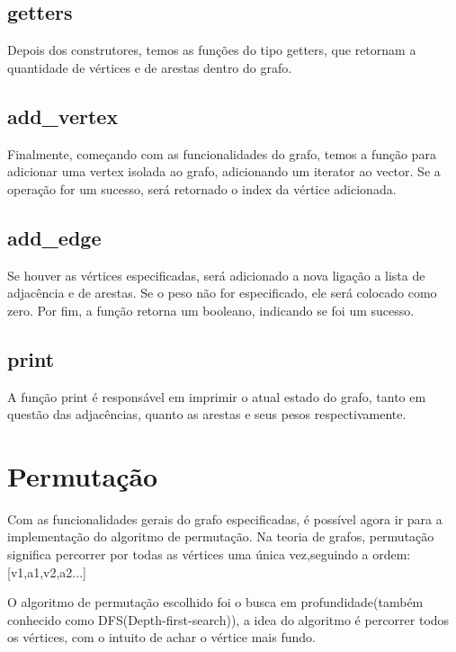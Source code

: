 \documentclass[12pt]{article}
\begin{document}
  \subsection{getters}

    Depois dos construtores, temos as funções do tipo getters, que retornam a quantidade de vértices 
    e de arestas dentro do grafo.

  \subsection{add\_vertex}

    Finalmente, começando com as funcionalidades do grafo, temos a função para adicionar 
    uma vertex isolada ao grafo, adicionando um iterator ao vector. Se a operação for um sucesso, 
    será retornado o index da vértice adicionada.

  \subsection{add\_edge}

    Se houver as vértices especificadas, será adicionado a nova ligação a lista de 
    adjacência e de arestas. Se o peso não for especificado, ele será colocado como zero.
    Por fim, a função retorna um booleano, indicando se foi um sucesso.

  \subsection{print}

    A função print é responsável em imprimir o atual estado do grafo, tanto
    em questão das adjacências, quanto as arestas e seus pesos respectivamente.

  \newpage

  \section{Permutação} \label{sec:permutation}

    Com as funcionalidades gerais do grafo especificadas, é possível agora ir para a 
    implementação do algoritmo de permutação. Na teoria de grafos, permutação significa
    percorrer por todas as vértices uma única vez,seguindo a ordem: [v1,a1,v2,a2...]

    O algoritmo de permutação escolhido foi o busca em profundidade(também conhecido 
    como DFS(Depth-first-search)), a idea do algoritmo é percorrer todos os vértices,
    com o intuito de achar o vértice mais fundo.
    
\end{document}
